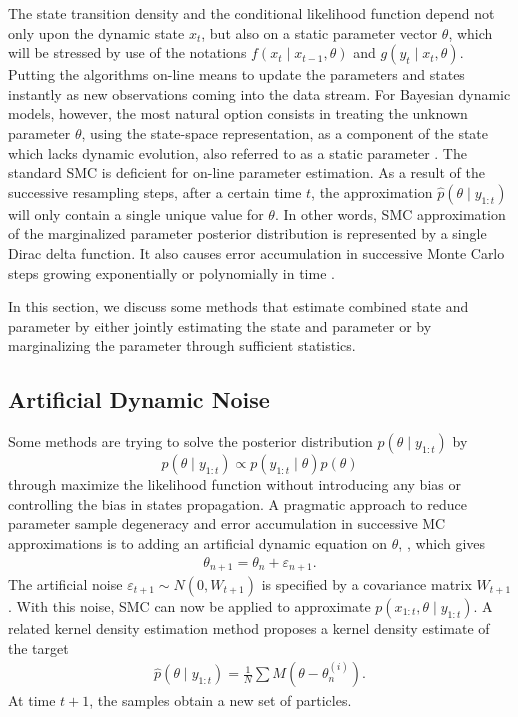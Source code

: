 The state transition density and the conditional likelihood function depend not only upon the dynamic state $x_t$, but also on a static parameter vector $\theta$, which will be stressed by use of the notations $f(x_t \mid x_{t-1},\theta)$ and $g(y_t\mid x_t,\theta)$. Putting the algorithms on-line means to update the parameters and states instantly as new observations coming into the data stream. For Bayesian dynamic models, however, the most natural option consists in treating the unknown parameter $\theta$, using the state-space representation, as a component of the state which lacks dynamic evolution, also referred to as a static parameter \citep{cappe2007overview}. The standard SMC is deficient for on-line parameter estimation. As a result of the successive resampling steps, after a certain time $t$, the approximation $\hat{p}(\theta\mid y_{1:t})$ will only contain a single unique value for $\theta$. In other words, SMC approximation of the marginalized parameter posterior distribution is represented by a single Dirac delta function. It also causes error accumulation in successive Monte Carlo steps growing exponentially or polynomially in time \citep{kantas2009overview}. 

In this section, we discuss some methods that estimate combined state and parameter by either jointly estimating the state and parameter or by marginalizing the parameter through sufficient statistics. 





\subsection{Artificial Dynamic Noise}\label{ArtificialNoise}

Some methods are trying to solve the posterior distribution $p(\theta \mid y_{1:t})$ by 
\begin{equation}
p(\theta \mid y_{1:t}) \propto p(y_{1:t} \mid \theta ) p(\theta )
\end{equation}
through maximize the likelihood function without introducing any bias or controlling the bias in states propagation. A pragmatic approach to reduce parameter sample degeneracy and error accumulation in successive MC approximations is to adding an artificial dynamic equation on $\theta$, \citep{higuchi2001self, kitagawa1998self}, which gives
\begin{align*}
\theta_{n+1} = \theta_n+\varepsilon_{n+1}.
\end{align*}
The artificial noise $\varepsilon_{t+1}\sim N(0,W_{t+1})$ is specified by a covariance matrix $W_{t+1}$. With this noise, SMC can now be applied to approximate $p(x_{1:t},\theta\mid y_{1:t})$. A related kernel density estimation method proposes a kernel density estimate of the target \citep{liu2001combined} 
\begin{align*}
\hat{p}(\theta\mid y_{1:t}) = \frac{1}{N}\sum M\left(\theta-\theta_n^{(i)}\right). 
\end{align*} 
At time $t+1$, the samples obtain a new set of particles. 


